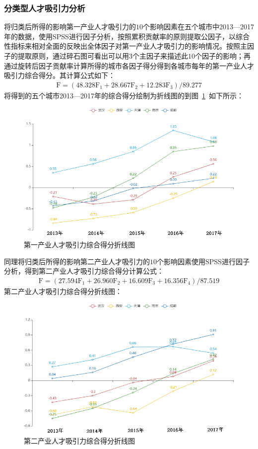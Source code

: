 \documentclass{whutmod}
\begin{document}
\begin{itemize}
	\subsubsection{分类型人才吸引力分析}
	将归类后所得的影响第一产业人才吸引力的$10$个影响因素在五个城市中2013—2017年的数据，使用SPSS进行因子分析，按照累积贡献率的原则提取公因子，以综合性指标来相对全面的反映出全体因子对第一产业人才吸引力的影响情况。按照主因子的提取原则，通过碎石图可看出可以用$3$个主因子来描述此$10$个因子的影响；再通过旋转后因子贡献率计算所得的城市各因子得分得到各城市每年的第一产业人才吸引力综合得分。其计算公式如下：
	\begin{gather}
	\mathrm { F } = \left( 48.328 \mathrm { F } _ { 1 } + 28.667 \mathrm { F } _ { 2 } + 12.283 \mathrm { F } _ { 3 } \right) / 89.277
	\end{gather}
	将得到的五个城市2013—2017年的综合得分绘制为折线图的到图~\ref{11}~如下所示：
	\begin{figure}[H]
		\centering
		\includegraphics[width=.9\textwidth]{figures/11.png}
		\caption{第一产业人才吸引力综合得分折线图}\label{11}
	\end{figure} 
	同理将归类后所得的影响第二产业人才吸引力的$10$个影响因素使用SPSS进行因子分析，得到第二产业人才吸引力综合得分计算公式：
	\begin{gather}
	\mathrm { F } = \left( 27.594 \mathrm { F } _ { 1 } + 26.960 \mathrm { F } _ { 2 } + 16.609 \mathrm { F } _ { 3 } + 16.356 \mathrm { F } _ { 4 } \right) / 87.519
	\end{gather}
	第二产业人才吸引力综合得分折线图：
	\begin{figure}[H]
		\centering
		\includegraphics[width=.9\textwidth]{figures/22.png}
		\caption{第二产业人才吸引力综合得分折线图}\label{22}
	\end{figure}
	

\end{itemize}
\end{document}
